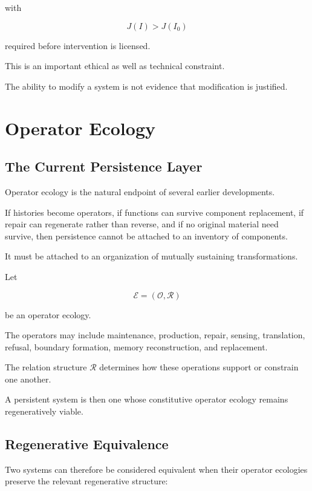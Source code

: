 \documentclass[11pt]{article}
\theoremstyle{remark}
\begin{document}
with

\begin{equation}
J(I)>J(I_0)
\end{equation}

required before intervention is licensed.

This is an important ethical as well as technical constraint.

The ability to modify a system is not evidence that modification is justified.

\section{Operator Ecology}

\subsection{The Current Persistence Layer}

Operator ecology is the natural endpoint of several earlier developments.

If histories become operators, if functions can survive component replacement, if repair can regenerate rather than reverse, and if no original material need survive, then persistence cannot be attached to an inventory of components.

It must be attached to an organization of mutually sustaining transformations.

Let

\begin{equation}
\mathcal{E}
=
(\mathcal{O},\mathcal{R})
\end{equation}

be an operator ecology.

The operators may include maintenance, production, repair, sensing, translation, refusal, boundary formation, memory reconstruction, and replacement.

The relation structure $\mathcal{R}$ determines how these operations support or constrain one another.

A persistent system is then one whose constitutive operator ecology remains regeneratively viable.

\subsection{Regenerative Equivalence}

Two systems can therefore be considered equivalent when their operator ecologies preserve the relevant regenerative structure:
\end{document}
